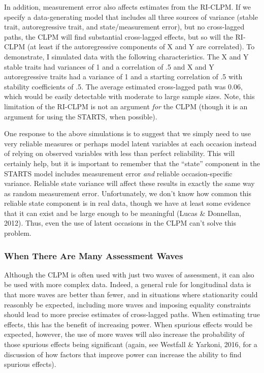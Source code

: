 \documentclass[
  english,
  man,floatsintext]{apa6}
\begin{document}
In addition, measurement error also affects estimates from the RI-CLPM. If we specify a data-generating model that includes all three sources of variance (stable trait, autoregressive trait, and state/measurement error), but no cross-lagged paths, the CLPM will find substantial cross-lagged effects, but so will the RI-CLPM (at least if the autoregressive components of X and Y are correlated). To demonstrate, I simulated data with the following characteristics. The X and Y stable traits had variances of 1 and a correlation of .5 and X and Y autoregressive traits had a variance of 1 and a starting correlation of .5 with stability coefficients of .5. The average estimated cross-lagged path was 0.06, which would be easily detectable with moderate to large sample sizes. Note, this limitation of the RI-CLPM is not an argument \emph{for} the CLPM (though it is an argument for using the STARTS, when possible).

One response to the above simulations is to suggest that we simply need to use very reliable measures or perhaps model latent variables at each occasion instead of relying on observed variables with less than perfect reliability. This will certainly help, but it is important to remember that the ``state'' component in the STARTS model includes measurement error \emph{and} reliable occasion-specific variance. Reliable state variance will affect these results in exactly the same way as random measurement error. Unfortunately, we don't know how common this reliable state component is in real data, though we have at least some evidence that it can exist and be large enough to be meaningful (Lucas \& Donnellan, 2012). Thus, even the use of latent occasions in the CLPM can't solve this problem.

\hypertarget{when-there-are-many-assessment-waves}{%
\subsubsection{When There Are Many Assessment Waves}\label{when-there-are-many-assessment-waves}}

Although the CLPM is often used with just two waves of assessment, it can also be used with more complex data. Indeed, a general rule for longitudinal data is that more waves are better than fewer, and in situations where stationarity could reasonbly be expected, including more waves and imposing equality constraints should lead to more precise estimates of cross-lagged paths. When estimating true effects, this has the benefit of increasing power. When spurious effects would be expected, however, the use of more waves will also increase the probability of those spurious effects being significant (again, see Westfall \& Yarkoni, 2016, for a discussion of how factors that improve power can increase the ability to find spurious effects).
\end{document}
